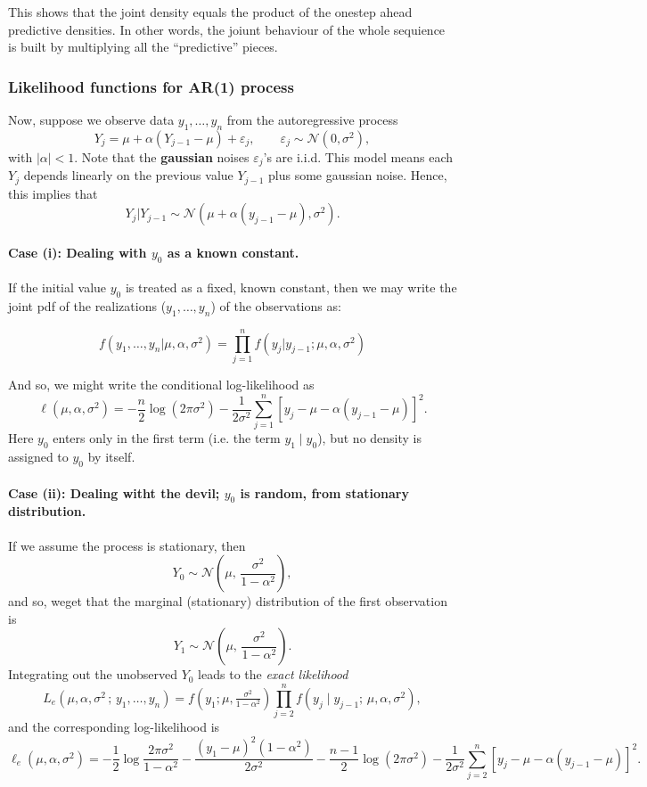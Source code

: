 This shows that the joint density equals the product of the onestep ahead predictive densities. In other words, the joiunt behaviour of the whole sequience is built by multiplying all the
``predictive'' pieces.

\subsubsection{Likelihood functions for AR(1) process}

Now, suppose we observe data $y_1, \ldots, y_n$ from the autoregressive process
\[
Y_j = \mu + \alpha(Y_{j-1} - \mu) + \varepsilon_j, 
\qquad \varepsilon_j \sim \mathcal{N}(0, \sigma^2),
\]
with $|\alpha| < 1$. Note that the \textbf{gaussian} noises $\varepsilon_j$'s are i.i.d. This model means each $Y_j$ depends linearly on the previous value $Y_{j-1}$ plus some gaussian noise.
Hence, this implies that 
$$Y_j | Y_{j-1} \sim \mathcal{N}(\mu + \alpha(y_{j-1} - \mu), \sigma^2).$$ 

\paragraph{Case (i): Dealing with $y_0$ as a known constant.}
If the initial value $y_0$ is treated as a fixed, known constant, then we may write the joint pdf of the realizations ($y_1, \ldots, y_n$) of the observations as:

$$f(y_1, \ldots, y_n | \mu, \alpha, \sigma^2) = \prod_{j=1}^{n} f(y_j | y_{j-1};\mu, \alpha, \sigma^2)$$

And so, we might write the conditional log-likelihood as
\[
\ell(\mu,\alpha,\sigma^2)
  = -\frac{n}{2}\log(2\pi\sigma^2)
    -\frac{1}{2\sigma^2}\sum_{j=1}^n
       [y_j-\mu-\alpha(y_{j-1}-\mu)]^2.
\]
Here $y_0$ enters only in the first term (i.e. the term $y_1 \mid y_0$),
but no density is assigned to $y_0$ by itself.

\paragraph{Case (ii): Dealing witht the devil; $y_0$ is random, from stationary distribution.}
If we assume the process is stationary, then
\[
Y_0 \sim \mathcal{N}\!\left(\mu,\,\frac{\sigma^2}{1-\alpha^2}\right),
\]
and so, weget that the marginal (stationary) distribution of the first observation is
\[
Y_1 \sim \mathcal{N}\!\left(\mu,\,\frac{\sigma^2}{1-\alpha^2}\right).
\]
Integrating out the unobserved $Y_0$ leads to the \emph{exact likelihood}
\[
L_e(\mu,\alpha,\sigma^2 \,;\, y_1,\ldots,y_n)
  = f\!\left(y_1; \mu, \tfrac{\sigma^2}{1-\alpha^2}\right)
    \prod_{j=2}^n f(y_j \mid y_{j-1};\, \mu,\alpha,\sigma^2),
\]
and the corresponding log-likelihood is
$$
\ell_e(\mu,\alpha,\sigma^2)
  = -\frac{1}{2}\log\!\frac{2\pi\sigma^2}{1-\alpha^2}
    -\frac{(y_1-\mu)^2(1-\alpha^2)}{2\sigma^2}
    -\frac{n-1}{2}\log(2\pi\sigma^2)
    -\frac{1}{2\sigma^2}\sum_{j=2}^n
       [y_j-\mu-\alpha(y_{j-1}-\mu)]^2.
$$

